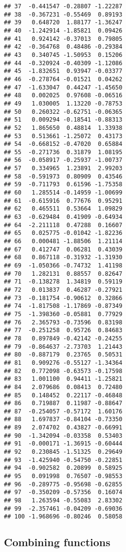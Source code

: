 \documentclass[12pt,a4paper]{scrartcl}\usepackage[]{graphicx}\usepackage[]{color}
\makeatletter
\newenvironment{kframe}{%
 \def\at@end@of@kframe{}%
 \ifinner\ifhmode%
  \def\at@end@of@kframe{\end{minipage}}%
  \begin{minipage}{\columnwidth}%
 \fi\fi%
 \def\FrameCommand##1{\hskip\@totalleftmargin \hskip-\fboxsep
 \colorbox{shadecolor}{##1}\hskip-\fboxsep
     \hskip-\linewidth \hskip-\@totalleftmargin \hskip\columnwidth}%
 \MakeFramed {\advance\hsize-\width
   \@totalleftmargin\z@ \linewidth\hsize
   \@setminipage}}%
 {\par\unskip\endMakeFramed%
 \at@end@of@kframe}
\newenvironment{knitrout}{}{} %
\makeatother
\begin{document}
\begin{Answer}
\begin{knitrout}
\begin{kframe}
\begin{verbatim}
## 37  -0.441547 -0.28807 -1.22287
## 38  -0.367231 -0.55469  0.89193
## 39   0.648720  1.88177 -1.36247
## 40  -1.242914 -1.85821  0.09426
## 41   0.924142 -0.37013  0.79805
## 42  -0.364768  0.48486 -0.29384
## 43   0.340745 -1.50953  0.15206
## 44  -0.320924 -0.40309 -1.12086
## 45  -1.832651  0.93947 -0.03377
## 46  -0.278764 -0.01521  0.04262
## 47  -1.633047  0.44247 -1.45650
## 48   0.002025  0.97608 -0.06516
## 49   1.030005  1.13220 -0.78753
## 50   0.260322 -0.62751 -0.06365
## 51   0.009294 -0.18541 -0.88313
## 52   1.865650  0.48814  1.33938
## 53   0.513661 -1.25072  0.43173
## 54  -0.668152 -0.47020  0.65884
## 55  -0.271736  0.31879  1.08195
## 56  -0.058917 -0.25937 -1.00737
## 57   0.334965  1.23891  2.99203
## 58  -0.591973  0.80909  0.43546
## 59  -0.711793  0.61596 -1.75358
## 60   1.285514 -0.14959 -1.00699
## 61  -0.615916  0.77676  0.95291
## 62   0.465511  0.53664  1.09829
## 63  -0.629484  0.41909 -0.64934
## 64  -2.211118  0.47288  0.16607
## 65   0.025775 -0.01042 -1.82236
## 66   0.000481 -1.88506  1.21114
## 67   0.412747  0.06281  0.43039
## 68   0.867118 -0.31932 -1.31930
## 69  -1.050366 -0.74732  1.41198
## 70   1.282131  0.88557  0.82647
## 71  -0.138278  1.34819  0.59119
## 72   0.013837  0.46287 -0.27921
## 73  -0.181754 -0.90612  0.32866
## 74  -1.817508 -1.17869 -0.87349
## 75  -1.398360 -0.05881  0.77929
## 76   2.365793 -0.73596  0.83198
## 77  -0.251258  0.95726  0.84683
## 78   0.897849 -0.42142 -0.24255
## 79  -0.864637 -2.73703  1.21443
## 80  -0.887179  0.23765  0.50531
## 81   0.909276 -0.55127 -1.34364
## 82   0.772098 -0.63573 -0.17598
## 83   1.001100  0.94411 -1.25821
## 84   2.079686  0.08413  0.72480
## 85   0.148452  0.22117 -0.46848
## 86   0.719887  0.11987 -0.88647
## 87  -0.254057 -0.57172  1.60176
## 88   1.697837 -0.84104 -0.73350
## 89   2.074702  0.43827 -0.66991
## 90  -1.342094 -0.03358  0.53403
## 91  -0.000171 -1.36915 -0.60444
## 92   0.230845 -1.51325  0.29649
## 93  -1.425940 -0.54750 -0.22851
## 94  -0.902582  0.20899  0.58925
## 95   0.091998  0.76507 -0.98553
## 96  -0.289775 -0.95698 -0.62855
## 97  -0.350209 -0.57356  0.16074
## 98   1.263594 -0.55083  2.83302
## 99  -2.357461 -0.04209 -0.69036
## 100 -1.968696 -0.80246  0.58058
\end{verbatim}
\end{kframe}
\end{knitrout}
\end{Answer}
\clearpage

\subsection{Combining functions}
\end{document}
